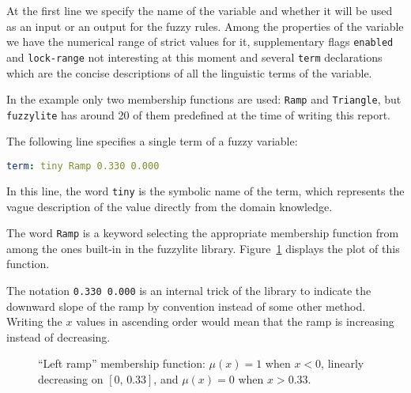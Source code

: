 \documentclass[12pt, a4paper]{report}
\begin{document}
  At the first line we specify the name of the variable and whether it will be used as an input or an output for the fuzzy rules.
  Among the properties of the variable we have the numerical range of strict values for it, supplementary flags \texttt{enabled} and \texttt{lock-range} not interesting at this moment
  and several \texttt{term} declarations which are the concise descriptions of all the linguistic terms of the variable.

  In the example only two membership functions are used: \texttt{Ramp} and \texttt{Triangle}, but \texttt{fuzzylite} has around 20 of them predefined at the time of writing this report.
  
  The following line specifies a single term of a fuzzy variable:
  
  \begin{lstlisting}[language=yaml]
  	term: tiny Ramp 0.330 0.000
  \end{lstlisting}
  
  In this line, the word \texttt{tiny} is the symbolic name of the term, which represents the vague description of the value directly from the domain knowledge.
  
  The word \texttt{Ramp} is a keyword selecting the appropriate membership function from among the ones built-in in the fuzzylite library.
  Figure~\ref{fig:left-ramp} displays the plot of this function.
  
  The notation \texttt{0.330 0.000} is an internal trick of the library to indicate the downward slope of the ramp by convention instead of some other method.
  Writing the $x$ values in ascending order would mean that the ramp is increasing instead of decreasing.
  
  \begin{figure}[htbp]
  	\centering
  	\caption{``Left ramp'' membership function: $\mu(x)=1$ when $x<0$, linearly decreasing on $[0,\,0.33]$, and $\mu(x)=0$ when $x>0.33$.}
  	\label{fig:left-ramp}
  \end{figure}
  
\end{document}
